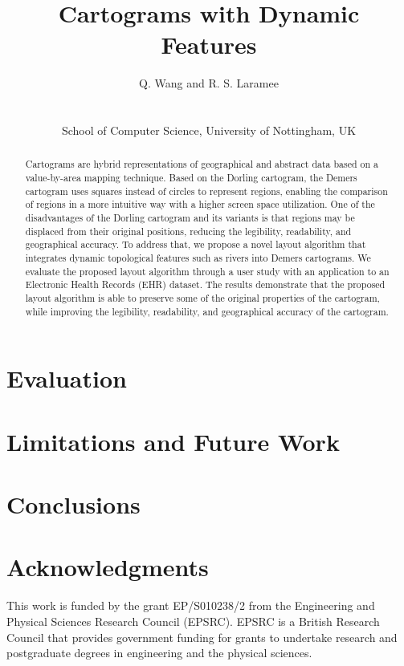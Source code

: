 \documentclass{egpubl}
\author[Q. Wang \& R. S. Laramee]
{\parbox{\textwidth}{\centering Q. Wang
  and R. S. Laramee
    }
    \\
\parbox{\textwidth}{\centering School of Computer Science, University of Nottingham, UK}
}
\title{Cartograms with Dynamic Features}
\begin{document}
\pagestyle{plain}

\maketitle

\begin{abstract}
Cartograms are hybrid representations of geographical and abstract data based on a value-by-area mapping technique. Based on the Dorling cartogram, the Demers cartogram uses squares instead of circles to represent regions, enabling the comparison of regions in a more intuitive way with a higher screen space utilization. One of the disadvantages of the Dorling cartogram and its variants is that regions may be displaced from their original positions, reducing the legibility, readability, and geographical accuracy. To address that, we propose a novel layout algorithm that integrates dynamic topological features such as rivers into Demers cartograms. We evaluate the proposed layout algorithm through a user study with an application to an Electronic Health Records (EHR) dataset. The results demonstrate that the proposed layout algorithm is able to preserve some of the original properties of the cartogram, while improving the legibility, readability, and geographical accuracy of the cartogram. 
\end{abstract}









\section{Evaluation}

\section{Limitations and Future Work}

\section{Conclusions}

\section{Acknowledgments}
This work is funded by the grant EP/S010238/2 from the Engineering and Physical Sciences Research Council (EPSRC). EPSRC is a British Research Council that provides government funding for grants to undertake research and postgraduate degrees in engineering and the physical sciences.

\let\section=\origsection
\printbibliography


\end{document}
